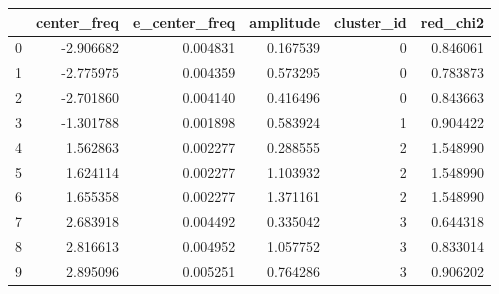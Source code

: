 \begin{tabular}{lrrrrr}
\toprule
 & center_freq & e_center_freq & amplitude & cluster_id & red_chi2 \\
\midrule
0 & -2.906682 & 0.004831 & 0.167539 & 0 & 0.846061 \\
1 & -2.775975 & 0.004359 & 0.573295 & 0 & 0.783873 \\
2 & -2.701860 & 0.004140 & 0.416496 & 0 & 0.843663 \\
3 & -1.301788 & 0.001898 & 0.583924 & 1 & 0.904422 \\
4 & 1.562863 & 0.002277 & 0.288555 & 2 & 1.548990 \\
5 & 1.624114 & 0.002277 & 1.103932 & 2 & 1.548990 \\
6 & 1.655358 & 0.002277 & 1.371161 & 2 & 1.548990 \\
7 & 2.683918 & 0.004492 & 0.335042 & 3 & 0.644318 \\
8 & 2.816613 & 0.004952 & 1.057752 & 3 & 0.833014 \\
9 & 2.895096 & 0.005251 & 0.764286 & 3 & 0.906202 \\
\bottomrule
\end{tabular}
